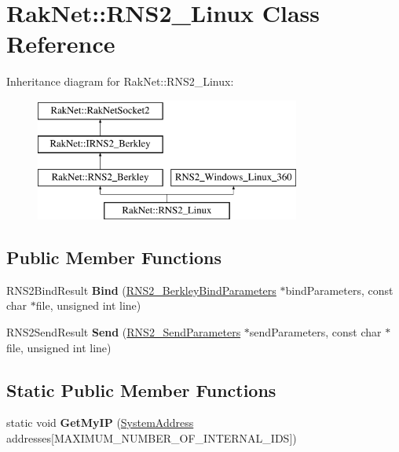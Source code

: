 \hypertarget{class_rak_net_1_1_r_n_s2___linux}{\section{Rak\-Net\-:\-:R\-N\-S2\-\_\-\-Linux Class Reference}
\label{class_rak_net_1_1_r_n_s2___linux}
}
Inheritance diagram for Rak\-Net\-:\-:R\-N\-S2\-\_\-\-Linux\-:\begin{figure}[H]
\begin{center}
\leavevmode
\includegraphics[height=4.000000cm]{class_rak_net_1_1_r_n_s2___linux}
\end{center}
\end{figure}
\subsection*{Public Member Functions}
\begin{DoxyCompactItemize}
\item 
\hypertarget{class_rak_net_1_1_r_n_s2___linux_a453f6b98980b36137d4a6ee5ea715c10}{R\-N\-S2\-Bind\-Result {\bfseries Bind} (\hyperlink{struct_rak_net_1_1_r_n_s2___berkley_bind_parameters}{R\-N\-S2\-\_\-\-Berkley\-Bind\-Parameters} $\ast$bind\-Parameters, const char $\ast$file, unsigned int line)}\label{class_rak_net_1_1_r_n_s2___linux_a453f6b98980b36137d4a6ee5ea715c10}

\item 
\hypertarget{class_rak_net_1_1_r_n_s2___linux_a8fd2a19048dbd9c77f7f460b754bdf6e}{R\-N\-S2\-Send\-Result {\bfseries Send} (\hyperlink{struct_rak_net_1_1_r_n_s2___send_parameters}{R\-N\-S2\-\_\-\-Send\-Parameters} $\ast$send\-Parameters, const char $\ast$file, unsigned int line)}\label{class_rak_net_1_1_r_n_s2___linux_a8fd2a19048dbd9c77f7f460b754bdf6e}

\end{DoxyCompactItemize}
\subsection*{Static Public Member Functions}
\begin{DoxyCompactItemize}
\item 
\hypertarget{class_rak_net_1_1_r_n_s2___linux_a3fee267663d8e7b3c976d55f0f4ed07c}{static void {\bfseries Get\-My\-I\-P} (\hyperlink{struct_rak_net_1_1_system_address}{System\-Address} addresses\mbox{[}M\-A\-X\-I\-M\-U\-M\-\_\-\-N\-U\-M\-B\-E\-R\-\_\-\-O\-F\-\_\-\-I\-N\-T\-E\-R\-N\-A\-L\-\_\-\-I\-D\-S\mbox{]})}\label{class_rak_net_1_1_r_n_s2___linux_a3fee267663d8e7b3c976d55f0f4ed07c}

\end{DoxyCompactItemize}
